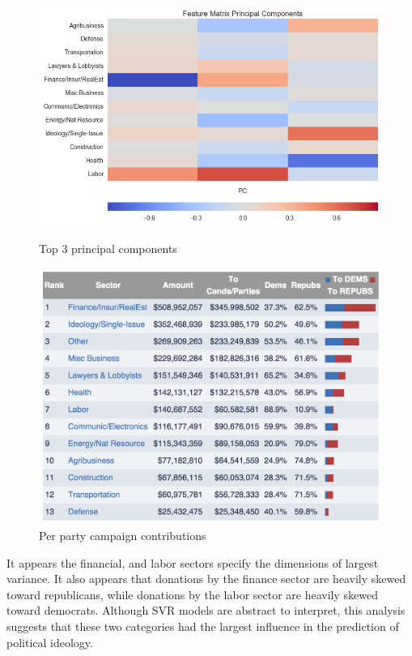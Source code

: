 \documentclass[12]{article}
\begin{document}
\begin{figure}[H]
\centering
\begin{minipage}[b]{0.5\textwidth}
    \includegraphics[width=\textwidth]{cand_2010_2012_2014_fm_trim_normed_pc_hm.png}
    \caption{\label{fig:top_pc}Top 3 principal components}
\end{minipage}
\begin{minipage}[b]{0.45\textwidth}
    \includegraphics[width=\textwidth]{totals_by_sector.png}
    \caption{\label{fig:party_total}Per party campaign contributions}
\end{minipage}
\end{figure}

\noindent It appears the financial, and labor sectors specify the dimensions of largest
variance. It also appears that donations by the finance sector are heavily skewed 
toward republicans, while donations by the labor sector are heavily skewed toward
democrats. Although SVR models are abstract to interpret, this analysis suggests
that these two categories had the largest influence in the prediction of political 
ideology.
\end{document}
